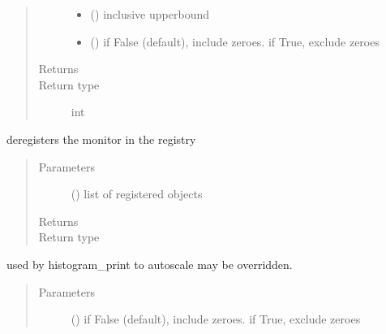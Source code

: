 \documentclass[letterpaper,10pt,english]{sphinxmanual}
\begin{document}
\begin{fulllineitems}
\begin{fulllineitems}
\begin{quote}
\begin{description}
\begin{itemize}
\item {} 
 () \textendash{} inclusive upperbound

\item {} 
 () \textendash{} if False (default), include zeroes. if True, exclude zeroes

\end{itemize}

\item[{Returns}] \leavevmode
{}

\item[{Return type}] \leavevmode
int

\end{description}\end{quote}

\end{fulllineitems}


\begin{fulllineitems}
\label{\detokenize{Reference:salabim.Monitor.deregister}}
deregisters the monitor in the registry
\begin{quote}\begin{description}
\item[{Parameters}] \leavevmode
{} () \textendash{} list of registered objects

\item[{Returns}] \leavevmode
{}

\item[{Return type}] \leavevmode
{\hyperref[\detokenize{Reference:salabim.Monitor}]{}}

\end{description}\end{quote}

\end{fulllineitems}


\begin{fulllineitems}
\label{\detokenize{Reference:salabim.Monitor.histogram_autoscale}}
used by histogram\_print to autoscale 
may be overridden.
\begin{quote}\begin{description}
\item[{Parameters}] \leavevmode
{} () \textendash{} if False (default), include zeroes. if True, exclude zeroes


\end{description}
\end{quote}
\end{fulllineitems}
\end{fulllineitems}
\end{document}
